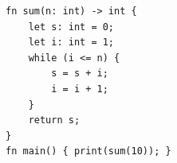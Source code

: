 \begin{lstlisting}[language=nova,]
fn sum(n: int) -> int {
    let s: int = 0;
    let i: int = 1;
    while (i <= n) {
        s = s + i;
        i = i + 1;
    }
    return s;
}
fn main() { print(sum(10)); }
\end{lstlisting}
